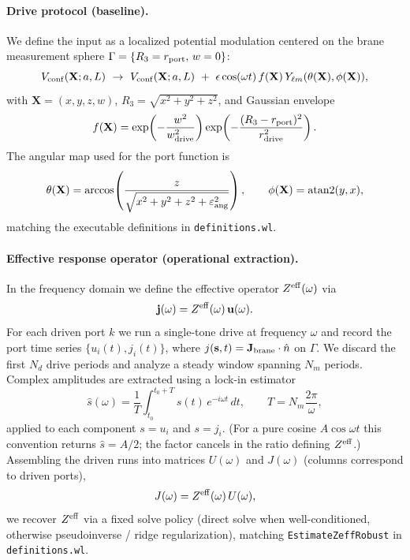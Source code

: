 \paragraph{Drive protocol (baseline).}
We define the input as a localized potential modulation centered on the brane measurement sphere $\Gamma=\{R_3=r_{\rm port},\,w=0\}$:
\begin{equation}
V_{\rm conf}(\mathbf X;a,L)\ \to\ V_{\rm conf}(\mathbf X;a,L)\ +\ \epsilon\cos(\omega t)\,f(\mathbf X)\,Y_{\ell m}(\theta(\mathbf X),\phi(\mathbf X)),
\end{equation}
with $\mathbf X=(x,y,z,w)$, $R_3=\sqrt{x^2+y^2+z^2}$, and Gaussian envelope
\begin{equation}
f(\mathbf X)=\exp\!\left(-\frac{w^2}{w_{\rm drive}^2}\right)\exp\!\left(-\frac{(R_3-r_{\rm port})^2}{r_{\rm drive}^2}\right).
\end{equation}
The angular map used for the port function is
\begin{equation}
\theta(\mathbf X)=\arccos\!\left(\frac{z}{\sqrt{x^2+y^2+z^2+\varepsilon_{\rm ang}^2}}\right),\qquad
\phi(\mathbf X)=\operatorname{atan2}(y,x),
\end{equation}
matching the executable definitions in \texttt{definitions.wl}.

\paragraph{Effective response operator (operational extraction).}
In the frequency domain we define the effective operator $Z^{\rm eff}(\omega)$ via
\begin{equation}
\mathbf j(\omega)=Z^{\rm eff}(\omega)\,\mathbf u(\omega).
\end{equation}
For each driven port $k$ we run a single-tone drive at frequency $\omega$ and record the port time series
$\{u_i(t),j_i(t)\}$, where $j(\mathbf s,t)=\mathbf J_{\rm brane}\cdot\hat n$ on $\Gamma$.
We discard the first $N_d$ drive periods and analyze a steady window spanning $N_m$ periods.
Complex amplitudes are extracted using a lock-in estimator
\begin{equation}
\widehat s(\omega)=\frac{1}{T}\int_{t_0}^{t_0+T} s(t)\,e^{-i\omega t}\,dt,\qquad T=N_m\frac{2\pi}{\omega},
\end{equation}
applied to each component $s=u_i$ and $s=j_i$.
(For a pure cosine $A\cos\omega t$ this convention returns $\widehat s=A/2$; the factor cancels in the ratio defining $Z^{\rm eff}$.)
Assembling the driven runs into matrices $U(\omega)$ and $J(\omega)$ (columns correspond to driven ports),
\begin{equation}
J(\omega)=Z^{\rm eff}(\omega)\,U(\omega),
\end{equation}
we recover $Z^{\rm eff}$ via a fixed solve policy (direct solve when well-conditioned, otherwise pseudoinverse / ridge regularization),
matching \texttt{EstimateZeffRobust} in \texttt{definitions.wl}.
